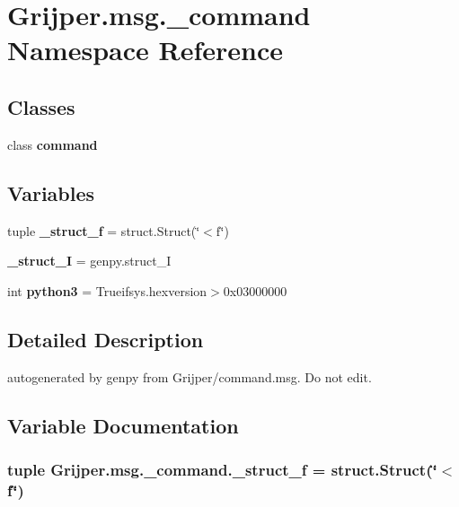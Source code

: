 \section{Grijper.\-msg.\-\_\-command Namespace Reference}
\label{namespaceGrijper_1_1msg_1_1__command}
\subsection*{Classes}
\begin{DoxyCompactItemize}
\item 
class {\bf command}
\end{DoxyCompactItemize}
\subsection*{Variables}
\begin{DoxyCompactItemize}
\item 
tuple {\bf \-\_\-struct\-\_\-f} = struct.\-Struct(\char`\"{}$<$f\char`\"{})
\item 
{\bf \-\_\-struct\-\_\-\-I} = genpy.\-struct\-\_\-\-I
\item 
int {\bf python3} = Trueifsys.\-hexversion$>$0x03000000
\end{DoxyCompactItemize}


\subsection{Detailed Description}
\begin{DoxyVerb}autogenerated by genpy from Grijper/command.msg. Do not edit.\end{DoxyVerb}
 

\subsection{Variable Documentation}
\subsubsection[{\-\_\-struct\-\_\-f}]{\setlength{\rightskip}{0pt plus 5cm}tuple Grijper.\-msg.\-\_\-command.\-\_\-struct\-\_\-f = struct.\-Struct(\char`\"{}$<$f\char`\"{})}\label{namespaceGrijper_1_1msg_1_1__command_ad07f9bbe8b47226c23ce61fe75de5c18}


